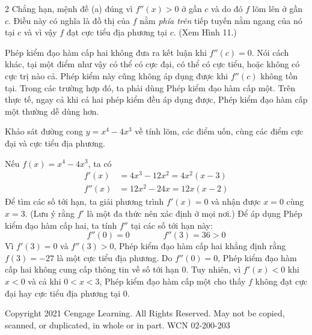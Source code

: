 \documentclass[10pt]{article}
\begin{document}
\begin{paracol}{2}
Chẳng hạn, mệnh đề (a) đúng vì $f''(x) > 0$ ở gần $c$ và do đó $f$ lõm lên ở gần $c$. Điều này có nghĩa là đồ thị của $f$ nằm \emph{phía trên} tiếp tuyến nằm ngang của nó tại $c$ và vì vậy $f$ đạt cực tiểu địa phương tại $c$. (Xem Hình 11.)

\vspace{0.3em}
\quad Phép kiểm đạo hàm cấp hai không đưa ra kết luận khi $f''(c) = 0$. Nói cách khác, tại một điểm như vậy có thể có cực đại, có thể có cực tiểu, hoặc không có cực trị nào cả. Phép kiểm này cũng không áp dụng được khi $f''(c)$ không tồn tại. Trong các trường hợp đó, ta phải dùng Phép kiểm đạo hàm cấp một. Trên thực tế, ngay cả khi cả hai phép kiểm đều áp dụng được, Phép kiểm đạo hàm cấp một thường dễ dùng hơn.

\vspace{0.4em}
\quad Khảo sát đường cong $y = x^4 - 4x^3$ về tính lõm, các điểm uốn, cùng các điểm cực đại và cực tiểu địa phương.

\vspace{0.2em}
\quad Nếu $f(x) = x^4 - 4x^3$, ta có
\begin{align*}
  f'(x) &= 4x^3 - 12x^2 = 4x^2(x - 3) \\[2pt]
  f''(x) &= 12x^2 - 24x = 12x(x - 2)
\end{align*}
Để tìm các số tới hạn, ta giải phương trình $f'(x) = 0$ và nhận được $x = 0$ cùng $x = 3$. (Lưu ý rằng $f'$ là một đa thức nên xác định ở mọi nơi.) Để áp dụng Phép kiểm đạo hàm cấp hai, ta tính $f''$ tại các số tới hạn này:
\[
  f''(0) = 0 \qquad\qquad f''(3) = 36 > 0
\]
Vì $f'(3) = 0$ và $f''(3) > 0$, Phép kiểm đạo hàm cấp hai khẳng định rằng $f(3) = -27$ là một cực tiểu địa phương. Do $f''(0) = 0$, Phép kiểm đạo hàm cấp hai không cung cấp thông tin về số tới hạn 0. Tuy nhiên, vì $f'(x) < 0$ khi $x < 0$ và cả khi $0 < x < 3$, Phép kiểm đạo hàm cấp một cho thấy $f$ không đạt cực đại hay cực tiểu địa phương tại 0.

\end{paracol}

\vfill
{\centering 
  \tiny\color{gray}
  Copyright 2021 Cengage Learning. All Rights Reserved. May not be copied, scanned, or duplicated, in whole or in part. WCN 02-200-203
\par}
\end{document}
